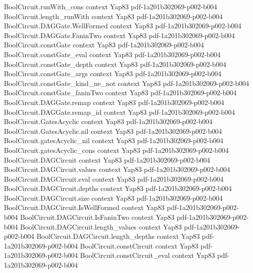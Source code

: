 \begin{theorem}
\proofstep
  {BoolCircuit.runWith_cons}
  {context}
  {Yap83}
  {pdf-1a201b302069-p002-b004}
\proofstep
  {BoolCircuit.length_runWith}
  {context}
  {Yap83}
  {pdf-1a201b302069-p002-b004}
\proofstep
  {BoolCircuit.DAGGate.WellFormed}
  {context}
  {Yap83}
  {pdf-1a201b302069-p002-b004}
\proofstep
  {BoolCircuit.DAGGate.FaninTwo}
  {context}
  {Yap83}
  {pdf-1a201b302069-p002-b004}
\proofstep
  {BoolCircuit.constGate}
  {context}
  {Yap83}
  {pdf-1a201b302069-p002-b004}
\proofstep
  {BoolCircuit.constGate_eval}
  {context}
  {Yap83}
  {pdf-1a201b302069-p002-b004}
\proofstep
  {BoolCircuit.constGate_depth}
  {context}
  {Yap83}
  {pdf-1a201b302069-p002-b004}
\proofstep
  {BoolCircuit.constGate_args}
  {context}
  {Yap83}
  {pdf-1a201b302069-p002-b004}
\proofstep
  {BoolCircuit.constGate_kind_ne_not}
  {context}
  {Yap83}
  {pdf-1a201b302069-p002-b004}
\proofstep
  {BoolCircuit.constGate_faninTwo}
  {context}
  {Yap83}
  {pdf-1a201b302069-p002-b004}
\proofstep
  {BoolCircuit.DAGGate.remap}
  {context}
  {Yap83}
  {pdf-1a201b302069-p002-b004}
\proofstep
  {BoolCircuit.DAGGate.remap_id}
  {context}
  {Yap83}
  {pdf-1a201b302069-p002-b004}
\proofstep
  {BoolCircuit.GatesAcyclic}
  {context}
  {Yap83}
  {pdf-1a201b302069-p002-b004}
\proofstep
  {BoolCircuit.GatesAcyclic.nil}
  {context}
  {Yap83}
  {pdf-1a201b302069-p002-b004}
\proofstep
  {BoolCircuit.gatesAcyclic_nil}
  {context}
  {Yap83}
  {pdf-1a201b302069-p002-b004}
\proofstep
  {BoolCircuit.gatesAcyclic_cons}
  {context}
  {Yap83}
  {pdf-1a201b302069-p002-b004}
\proofstep
  {BoolCircuit.DAGCircuit}
  {context}
  {Yap83}
  {pdf-1a201b302069-p002-b004}
\proofstep
  {BoolCircuit.DAGCircuit.values}
  {context}
  {Yap83}
  {pdf-1a201b302069-p002-b004}
\proofstep
  {BoolCircuit.DAGCircuit.eval}
  {context}
  {Yap83}
  {pdf-1a201b302069-p002-b004}
\proofstep
  {BoolCircuit.DAGCircuit.depths}
  {context}
  {Yap83}
  {pdf-1a201b302069-p002-b004}
\proofstep
  {BoolCircuit.DAGCircuit.size}
  {context}
  {Yap83}
  {pdf-1a201b302069-p002-b004}
\proofstep
  {BoolCircuit.DAGCircuit.IsWellFormed}
  {context}
  {Yap83}
  {pdf-1a201b302069-p002-b004}
\proofstep
  {BoolCircuit.DAGCircuit.IsFaninTwo}
  {context}
  {Yap83}
  {pdf-1a201b302069-p002-b004}
\proofstep
  {BoolCircuit.DAGCircuit.length_values}
  {context}
  {Yap83}
  {pdf-1a201b302069-p002-b004}
\proofstep
  {BoolCircuit.DAGCircuit.length_depths}
  {context}
  {Yap83}
  {pdf-1a201b302069-p002-b004}
\proofstep
  {BoolCircuit.constCircuit}
  {context}
  {Yap83}
  {pdf-1a201b302069-p002-b004}
\proofstep
  {BoolCircuit.constCircuit_eval}
  {context}
  {Yap83}
  {pdf-1a201b302069-p002-b004}

\end{theorem}

